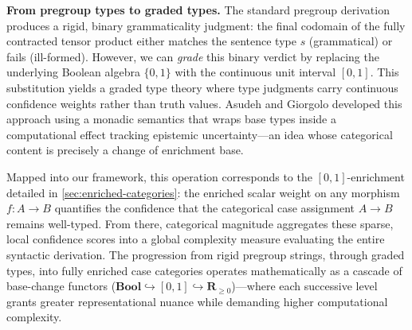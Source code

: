 \documentclass[
]{article}
\begin{document}
\textbf{From pregroup types to graded types.} The standard pregroup
derivation produces a rigid, binary grammaticality judgment: the final
codomain of the fully contracted tensor product either matches the
sentence type \(s\) (grammatical) or fails (ill-formed). However, we can
\emph{grade} this binary verdict by replacing the underlying Boolean
algebra \(\{0,1\}\) with the continuous unit interval \([0,1]\). This
substitution yields a graded type theory where type judgments carry
continuous confidence weights rather than truth values. Asudeh and
Giorgolo \citeyearpar{asudeh2020graded} developed this approach using a
monadic semantics that wraps base types inside a computational effect
tracking epistemic uncertainty---an idea whose categorical content is
precisely a change of enrichment base.

Mapped into our framework, this operation corresponds to the
\([0,1]\)-enrichment detailed in \autoref{sec:enriched-categories}: the
enriched scalar weight on any morphism \(f: A \to B\) quantifies the
confidence that the categorical case assignment \(A \to B\) remains
well-typed. From there, categorical magnitude aggregates these sparse,
local confidence scores into a global complexity measure evaluating the
entire syntactic derivation. The progression from rigid pregroup
strings, through graded types, into fully enriched case categories
operates mathematically as a cascade of base-change functors
(\(\mathbf{Bool} \hookrightarrow [0,1] \hookrightarrow \mathbf{R}_{\geq 0}\))---where
each successive level grants greater representational nuance while
demanding higher computational complexity.
\end{document}
